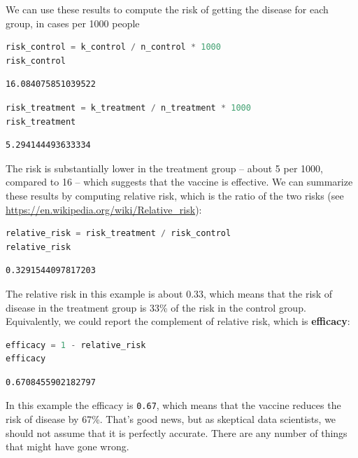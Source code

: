 We can use these results to compute the risk of getting the disease for
each group, in cases per 1000 people

\begin{lstlisting}[language=Python,style=source]
risk_control = k_control / n_control * 1000
risk_control
\end{lstlisting}

\begin{lstlisting}[style=output]
16.084075851039522
\end{lstlisting}

\begin{lstlisting}[language=Python,style=source]
risk_treatment = k_treatment / n_treatment * 1000
risk_treatment
\end{lstlisting}

\begin{lstlisting}[style=output]
5.294144493633334
\end{lstlisting}

The risk is substantially lower in the treatment group -- about 5 per
1000, compared to 16 -- which suggests that the vaccine is effective. We
can summarize these results by computing relative risk, which is the
ratio of the two risks (see
\url{https://en.wikipedia.org/wiki/Relative_risk}):

\begin{lstlisting}[language=Python,style=source]
relative_risk = risk_treatment / risk_control
relative_risk
\end{lstlisting}

\begin{lstlisting}[style=output]
0.3291544097817203
\end{lstlisting}

The relative risk in this example is about 0.33, which means that the
risk of disease in the treatment group is 33\% of the risk in the
control group. Equivalently, we could report the complement of relative
risk, which is \textbf{efficacy}:

\begin{lstlisting}[language=Python,style=source]
efficacy = 1 - relative_risk
efficacy
\end{lstlisting}

\begin{lstlisting}[style=output]
0.6708455902182797
\end{lstlisting}

In this example the efficacy is \passthrough{\lstinline!0.67!}, which
means that the vaccine reduces the risk of disease by 67\%. That's good
news, but as skeptical data scientists, we should not assume that it is
perfectly accurate. There are any number of things that might have gone
wrong.

